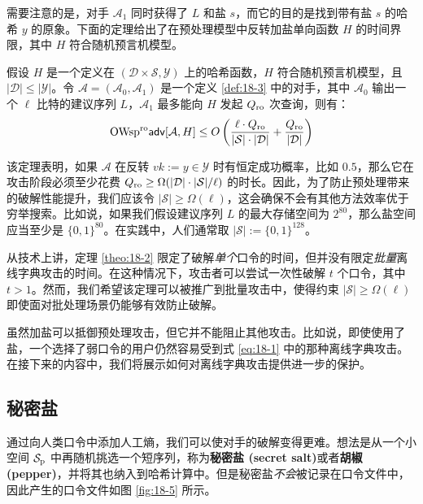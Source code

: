 需要注意的是，对手 $\mathcal{A}_1$ 同时获得了 $L$ 和盐 $s$，而它的目的是找到带有盐 $s$ 的哈希 $y$ 的原象。下面的定理给出了在预处理模型中反转加盐单向函数 $H$ 的时间界限，其中 $H$ 符合随机预言机模型。

\begin{theorem}\label{theo:18-2}
	假设 $H$ 是一个定义在 $(\mathcal{D}\times\mathcal{S},\mathcal{Y})$ 上的哈希函数，$H$ 符合随机预言机模型，且 $|\mathcal{D}|\leq|\mathcal{Y}|$。令 $\mathcal{A}=(\mathcal{A}_0,\mathcal{A}_1)$ 是一个定义 \ref{def:18-3} 中的对手，其中 $\mathcal{A}_0$ 输出一个 $\ell$ 比特的建议序列 $L$，$\mathcal{A}_1$ 最多能向 $H$ 发起 $Q_{\rm ro}$ 次查询，则有：
	\begin{equation}
	{\rm OWsp^{ro}\mathsf{adv}}[\mathcal{A},H]
	\leq
	O\left(\frac{\ell\cdot Q_{\rm ro}}{|\mathcal{S}|\cdot |\mathcal{D}|}+\frac{Q_{\rm ro}}{|\mathcal{D}|}\right)	
	\end{equation}
\end{theorem}

该定理表明，如果 $\mathcal{A}$ 在反转 $vk:=y\in\mathcal{Y}$ 时有恒定成功概率，比如 $0.5$，那么它在攻击阶段必须至少花费 $Q_{\rm ro}\geq\Omega({|\mathcal{D}|\cdot|\mathcal{S}|}/{\ell})$ 的时长。因此，为了防止预处理带来的破解性能提升，我们应该令 $|\mathcal{S}|\geq\Omega(\ell)$，这会确保不会有其他方法效率优于穷举搜索。比如说，如果我们假设建议序列 $L$ 的最大存储空间为 $2^{80}$，那么盐空间应当至少是 $\{0,1\}^{80}$。在实践中，人们通常取 $|\mathcal{S}|:=\{0,1\}^{128}$。

从技术上讲，定理 \ref{theo:18-2} 限定了破解\emph{单个}口令的时间，但并没有限定\emph{批量}离线字典攻击的时间。在这种情况下，攻击者可以尝试一次性破解 $t$ 个口令，其中$t>1$。然而，我们希望该定理可以被推广到批量攻击中，使得约束 $|\mathcal{S}|\geq\Omega(\ell)$ 即使面对批处理场景仍能够有效防止破解。

\begin{snote}[加盐的局限性.]
虽然加盐可以抵御预处理攻击，但它并不能阻止其他攻击。比如说，即使使用了盐，一个选择了弱口令的用户仍然容易受到式 \ref{eq:18-1}  中的那种离线字典攻击。在接下来的内容中，我们将展示如何对离线字典攻击提供进一步的保护。
\end{snote}

\subsection{秘密盐}

通过向人类口令中添加人工熵，我们可以使对手的破解变得更难。想法是从一个小空间 $\mathcal{S}_{\rm p}$ 中再随机挑选一个短序列，称为\textbf{秘密盐 (secret salt)}或者\textbf{胡椒 (pepper)}，并将其也纳入到哈希计算中。但是秘密盐\emph{不会}被记录在口令文件中，因此产生的口令文件如图 \ref{fig:18-5} 所示。

